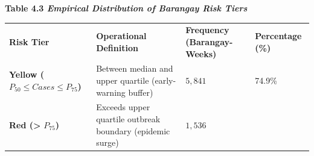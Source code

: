 \documentclass[
]{article}
\newcounter{none} %
\begin{document}
\textbf{Table 4.3 \emph{Empirical Distribution of Barangay Risk Tiers }}

{\def\LTcaptype{none} %
\begin{longtable}[]{@{}
  >{\raggedright\arraybackslash}p{}
  >{\raggedright\arraybackslash}p{}
  >{\raggedright\arraybackslash}p{}
  >{\raggedright\arraybackslash}p{}@{}}
\toprule\noalign{}
\begin{minipage}[b]{\linewidth}\raggedright
\textbf{Risk Tier}
\end{minipage} & \begin{minipage}[b]{\linewidth}\raggedright
\textbf{Operational Definition}
\end{minipage} & \begin{minipage}[b]{\linewidth}\raggedright
\textbf{Frequency (Barangay-Weeks)}
\end{minipage} & \begin{minipage}[b]{\linewidth}\raggedright
\textbf{Percentage (\%)}
\end{minipage} \\
\begin{minipage}[b]{\linewidth}\raggedright
\textbf{Yellow (}\(P_{50} \leq Cases \leq P_{75}\)\textbf{)}
\end{minipage} & \begin{minipage}[b]{\linewidth}\raggedright
Between median and upper quartile (early-warning buffer)
\end{minipage} & \begin{minipage}[b]{\linewidth}\raggedright
\(5,841\)
\end{minipage} & \begin{minipage}[b]{\linewidth}\raggedright
74.9\%
\end{minipage} \\
\begin{minipage}[b]{\linewidth}\raggedright
\textbf{Red (\textgreater{}} \(P_{75}\)\textbf{)}
\end{minipage} & \begin{minipage}[b]{\linewidth}\raggedright
Exceeds upper quartile outbreak boundary (epidemic surge)
\end{minipage} & \begin{minipage}[b]{\linewidth}\raggedright
\(1,536\)
\end{minipage} & \begin{minipage}[b]{\linewidth}\raggedright

\end{minipage}
\end{longtable}}
\end{document}
